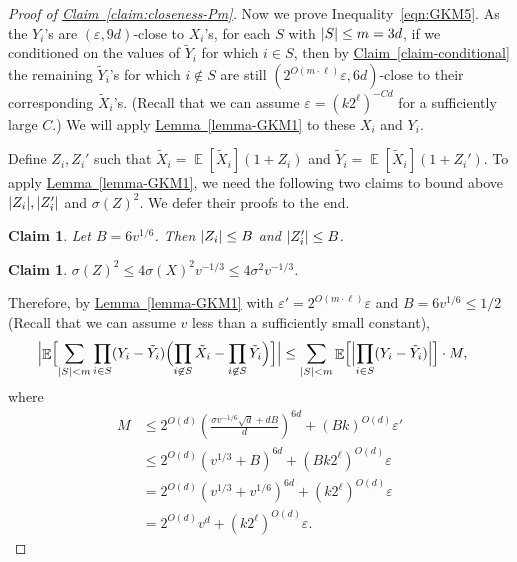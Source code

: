 \documentclass[11pt]{article}
\numberwithin{equation}{section}
\newtheorem{claim}[theorem]{Claim}
\theoremstyle{definition}
\theoremstyle{plain}
\newcommand{\expref}[2]{\hyperref[#2]{#1~\ref{#2}}}
\def\eps{\varepsilon}
\def\Blocklength{\ell}
\DeclarePairedDelimiter{\abs}{\lvert}{\rvert}
\DeclareMathOperator*{\E}{\mathbb{E}}                 %
\begin{document}
\begin{proof}[Proof of {\expref{Claim}{claim:closeness-Pm}}]
    \medskip

    Now we prove Inequality~\eqref{eqn:GKM5}.
    As the $Y_i$'s are $(\eps, 9d)$-close to $X_i$'s, for each $S$ with $\abs{S} \le m = 3d$, if we conditioned on the values of $\tilde Y_i$ for which $i \in S$, then by \expref{Claim}{claim-conditional} the remaining $\tilde Y_i$'s for which $i \not\in S$ are still $(2^{O(m \cdot \Blocklength)} \eps, 6d)$-close to their corresponding $\tilde X_i$'s.
    (Recall that we can assume $\eps = (k2^\Blocklength)^{-Cd}$ for a sufficiently large $C$.)
    We will apply \expref{Lemma}{lemma-GKM1} to these $X_i$ and $Y_i$.

    \medskip

    Define $Z_i, Z_i'$ such that $\tilde X_i = \E[\tilde X_i](1 + Z_i)$ and $\tilde Y_i = \E[\tilde X_i](1 + Z_i')$.
    To apply \expref{Lemma}{lemma-GKM1}, we need the following two claims to bound above $\abs{Z_i}, \abs{Z_i'}$ and $\sigma(Z)^2$.
    We defer their proofs to the end.
    \begin{claim} \label{claim-norm-of-tilde-Z}
      Let $B = 6 v^{1/6}$.
      Then $\abs{Z_i} \le B$ and $\abs{Z_i'} \le B$.
    \end{claim}

    \begin{claim} \label{claim-var-of-tilde-Z}
      $\sigma(Z)^2 \le 4 \sigma(X)^2 v^{-1/3} \le 4 \sigma^2 v^{-1/3}$.
    \end{claim}

    Therefore, by \expref{Lemma}{lemma-GKM1} with $\eps' = 2^{O(m \cdot \Blocklength)} \eps$ and $B = 6 v^{1/6} \le 1/2$ (Recall that we can assume $v$ less than a sufficiently small constant),
    \begin{align*}
      \Bigl| \E \Bigl[ \sum_{\abs{S} < m} \prod_{i \in S} (Y_i - \tilde Y_i) \Bigl( \prod_{i \not\in S} \tilde X_i - \prod_{i \not\in S} \tilde Y_i \Bigr) \Bigr] \Bigr|
      &\le \sum_{\abs{S} < m} \E \Bigl[ \Bigl| \prod_{i \in S} (Y_i - \tilde Y_i) \Bigr| \Bigr] \cdot M ,
    \end{align*}
    where
    \begin{align*}
      M
      &\le 2^{O(d)} \left( \frac{ \sigma v^{-1/6} \sqrt{d} + dB } {d} \right)^{6d} + (B k)^{O(d)} \eps' \\
      &\le 2^{O(d)} ( v^{1/3} + B )^{6d} + (B k 2^\Blocklength)^{O(d)} \eps \\
      &= 2^{O(d)} \left( v^{1/3}  + v^{1/6} \right)^{6d} + (k 2^\Blocklength)^{O(d)} \eps \\
      &= 2^{O(d)} v^d + (k 2^\Blocklength)^{O(d)} \eps .
    \end{align*}


\end{proof}
\end{document}

